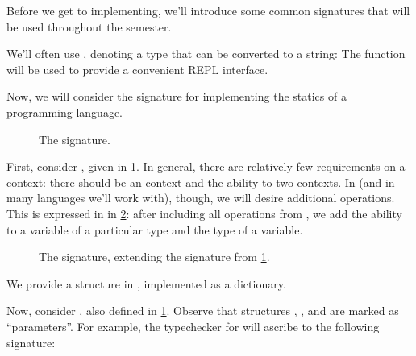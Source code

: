 \documentclass[11pt]{article}
\begin{document}
Before we get to implementing, we'll introduce some common signatures that will be used throughout the semester.

We'll often use , denoting a type that can be converted to a string:
The  function will be used to provide a convenient REPL interface.

Now, we will consider the signature for implementing the statics of a programming language.

\begin{figure}
  \caption{The  signature.}
  \label{fig:statics}
\end{figure}

First, consider , given in \cref{fig:statics}.
In general, there are relatively few requirements on a context: there should be an  context and the ability to  two contexts.
In \LangPSF{} (and in many languages we'll work with), though, we will desire additional operations.
This is expressed in  in \cref{fig:context-psf}: after including all operations from , we add the ability to  a variable of a particular type and  the type of a variable.

\begin{figure}
  \caption{The  signature, extending the  signature from \cref{fig:statics}.}
  \label{fig:context-psf}
\end{figure}

We provide a structure  in , implemented as a dictionary.

Now, consider , also defined in \cref{fig:statics}.
Observe that structures , , and  are marked as ``parameters''.
For example, the typechecker for \LangPSF{} will ascribe to the following signature:
\end{document}
